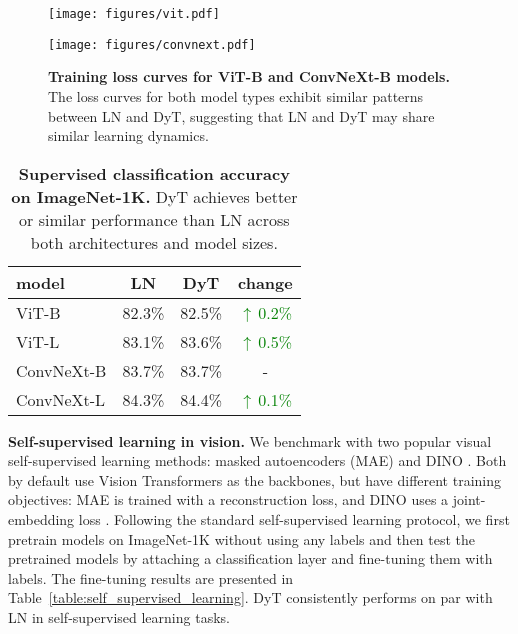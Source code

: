 \documentclass[]{fairmeta}
\newcommand{\tablestyle}[2]{\setlength{\tabcolsep}{#1}\renewcommand{\arraystretch}{#2}\centering\footnotesize}
\renewcommand{\paragraph}[1]{\vspace{1.25mm}\noindent\textbf{#1}}
\newcommand{\better}[1]{\textcolor{green}{$\uparrow\,$#1}}
\begin{document}
\begin{figure*}[t]
\vspace{5ex}
\centering
\begin{minipage}{0.49\textwidth}
\texttt{[image: figures/vit.pdf]}
\end{minipage}
\hfill
\begin{minipage}{0.49\textwidth}
\hspace*{-0.3cm}
  \texttt{[image: figures/convnext.pdf]}
\end{minipage}
\caption{\textbf{Training loss curves for ViT-B and ConvNeXt-B models.} The loss curves for both model types exhibit similar patterns between LN and DyT, suggesting that LN and DyT may share similar learning dynamics.}
\label{figure:sup_curve}
\vspace{2ex}
\end{figure*}

\begin{table}[h]
\centering
\tablestyle{7pt}{1.15}
\begin{tabular}{lccc}
\toprule
model & LN & DyT & change \\
\midrule
ViT-B & 82.3\% & 82.5\% & \better{0.2\%} \\
ViT-L & 83.1\% & 83.6\% & \better{0.5\%} \\
ConvNeXt-B & 83.7\% & 83.7\% & - \\
ConvNeXt-L & 84.3\% & 84.4\% & \better{0.1\%} \\
\midrule
  \end{tabular}
\caption{\textbf{Supervised classification accuracy on ImageNet-1K.} DyT achieves better or similar performance than LN across both architectures and model sizes.}
\label{table:classification}
\end{table}






\paragraph{Self-supervised learning in vision.}
We benchmark with two popular visual self-supervised learning methods: masked autoencoders (MAE) \citep{he2022masked} and DINO \citep{caron2021emerging}. Both by default use Vision Transformers as the backbones, but have different training objectives: MAE is trained with a reconstruction loss, and DINO uses a joint-embedding loss \citep{lecun2022path}.
Following the standard self-supervised learning protocol, we first pretrain models on ImageNet-1K without using any labels and then test the pretrained models by attaching a classification layer and fine-tuning them with labels.
The fine-tuning results are presented in Table~\ref{table:self_supervised_learning}. DyT consistently performs on par with LN in self-supervised learning tasks.
\end{document}
